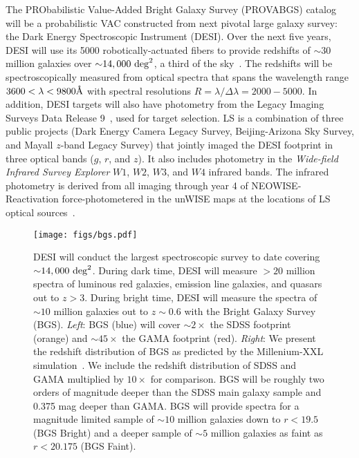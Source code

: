 The PRObabilistic Value-Added Bright Galaxy Survey (PROVABGS) catalog will be a
probabilistic VAC constructed from next pivotal large galaxy survey: the Dark
Energy Spectroscopic Instrument (DESI).
Over the next five years, DESI will use its 5000 robotically-actuated fibers to
provide redshifts of ${\sim}30$ million galaxies over 
${\sim}14,000~{\rm deg}^2$, a third of the sky~\citep{desicollaboration2016,
desicollaboration2016a}.
The redshifts will be spectroscopically measured from optical spectra that
spans the wavelength range $3600 < \lambda < 9800\AA$ with spectral resolutions
$R = \lambda/\Delta \lambda = 2000 - 5000$.
In addition, DESI targets will also have photometry from the Legacy Imaging
Surveys Data Release 9~\citep[LS;][]{dey2019}, used for target selection. 
LS is a combination of three public projects (Dark Energy Camera Legacy Survey,
Beijing-Arizona Sky Survey, and Mayall $z$-band Legacy Survey) that jointly
imaged the DESI footprint in three optical bands ($g$, $r$, and $z$). 
It also includes photometry in the \emph{Wide-field Infrared Survey Explorer}
$W1$, $W2$, $W3$, and $W4$ infrared bands.
The infrared photometry is derived from all imaging through year 4 of
NEOWISE-Reactivation force-photometered in the unWISE maps at the locations of
LS optical sources~\citep{meisner2017a, meisner2017}.

\begin{figure}
\begin{center}
\texttt{[image: figs/bgs.pdf]} 
\caption{
    DESI will conduct the largest spectroscopic survey to date covering
    ${\sim}14,000~{\rm deg}^2$. 
    During dark time, DESI will measure ${>}20$ million spectra of luminous red
    galaxies, emission line galaxies, and quasars out to $z > 3$.
    During bright time, DESI will measure the spectra of ${\sim}10$ million
    galaxies out to $z{\sim}0.6$ with the Bright Galaxy Survey (BGS).
    {\em Left}: BGS (blue) will cover ${\sim}2\times$ the SDSS footprint
    (orange) and ${\sim}45\times$ the GAMA footprint (red).
    {\em Right}: We present the redshift distribution of BGS as predicted by
    the Millenium-XXL simulation~\citep[blue;][]{smith2017}. 
    We include the redshift distribution of SDSS and GAMA multiplied by
    $10\times$ for comparison. 
    BGS will be roughly two orders of magnitude deeper than the SDSS main
    galaxy sample and 0.375 mag deeper than GAMA.
    BGS will provide spectra for a magnitude limited sample of ${\sim}10$
    million galaxies down to $r < 19.5$ (BGS Bright) and a deeper sample of
    ${\sim 5}$ million galaxies as faint as $r < 20.175$ (BGS Faint).
}
\label{fig:bgs}
\end{center}
\end{figure}

